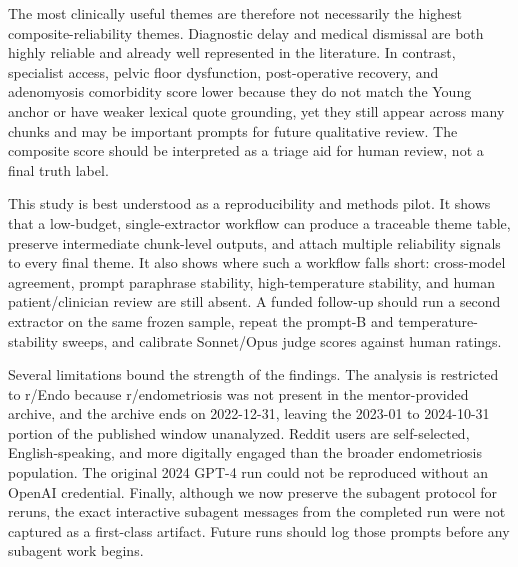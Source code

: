 The most clinically useful themes are therefore not necessarily the
highest composite-reliability themes. Diagnostic delay and medical
dismissal are both highly reliable and already well represented in the
literature. In contrast, specialist access, pelvic floor dysfunction,
post-operative recovery, and adenomyosis comorbidity score lower
because they do not match the Young anchor or have weaker lexical quote
grounding, yet they still appear across many chunks and may be
important prompts for future qualitative review. The composite score
should be interpreted as a triage aid for human review, not a final
truth label.

This study is best understood as a reproducibility and methods pilot.
It shows that a low-budget, single-extractor workflow can produce a
traceable theme table, preserve intermediate chunk-level outputs, and
attach multiple reliability signals to every final theme. It also shows
where such a workflow falls short: cross-model agreement, prompt
paraphrase stability, high-temperature stability, and human
patient/clinician review are still absent. A funded follow-up should
run a second extractor on the same frozen sample, repeat the prompt-B
and temperature-stability sweeps, and calibrate Sonnet/Opus judge
scores against human ratings.

Several limitations bound the strength of the findings. The analysis is
restricted to r/Endo because r/endometriosis was not present in the
mentor-provided archive, and the archive ends on 2022-12-31, leaving the
2023-01 to 2024-10-31 portion of the published window unanalyzed. Reddit
users are self-selected, English-speaking, and more digitally engaged
than the broader endometriosis population. The original 2024 GPT-4 run
could not be reproduced without an OpenAI credential. Finally, although
we now preserve the subagent protocol for reruns, the exact interactive
subagent messages from the completed run were not captured as a
first-class artifact. Future runs should log those prompts before any
subagent work begins.
